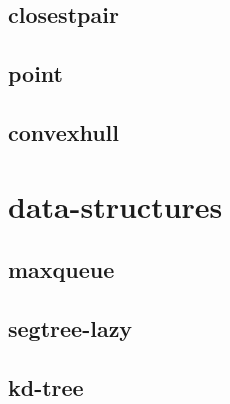 \vspace{-2pt}
\subsection{closestpair}
\vspace{-5pt}
\raggedbottom
\hrulefill

\vspace{-2pt}
\subsection{point}
\vspace{-5pt}
\raggedbottom
\hrulefill

\vspace{-2pt}
\subsection{convexhull}
\vspace{-5pt}
\raggedbottom
\hrulefill


\section{data-structures}
\vspace{-2pt}
\subsection{maxqueue}
\vspace{-5pt}
\raggedbottom
\hrulefill

\vspace{-2pt}
\subsection{segtree-lazy}
\vspace{-5pt}
\raggedbottom
\hrulefill

\vspace{-2pt}
\subsection{kd-tree}
\vspace{-5pt}
\raggedbottom
\hrulefill

